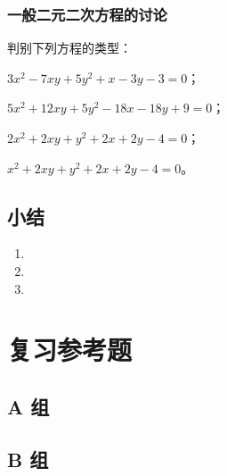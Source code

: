 \subsection{一般二元二次方程的讨论}
\begin{Practice}
  判别下列方程的类型：
  \begin{question}
    \item $3x^2-7xy+5y^2+x-3y-3=0$；
    \item $5x^2+12xy+5y^2-18x-18y+9=0$；
    \item $2x^2+2xy+y^2+2x+2y-4=0$；
    \item $x^2+2xy+y^2+2x+2y-4=0$。
  \end{question}
\end{Practice}
\begin{Exercise}
  \begin{question}
    \item 
    \item 
    \item 
    \item 
    \item 
    \item 
  \end{question}
\end{Exercise}
\section*{小结}
\begin{enumerate}[C、,itemindent=4.5em]
  \item 
  \item 
  \item 
\end{enumerate}
\chapter*{复习参考题}
\section*{A 组}
\begin{question}
  \item 
  \item 
  \item 
  \item 
  \item 
  \item 
  \item 
  \item 
  \item 
  \item 
  \item 
  \item 
\end{question}
\section*{B 组}
\begin{question}
  \item 
  \item 
  \item 
  \item 
  \item 
\end{question}